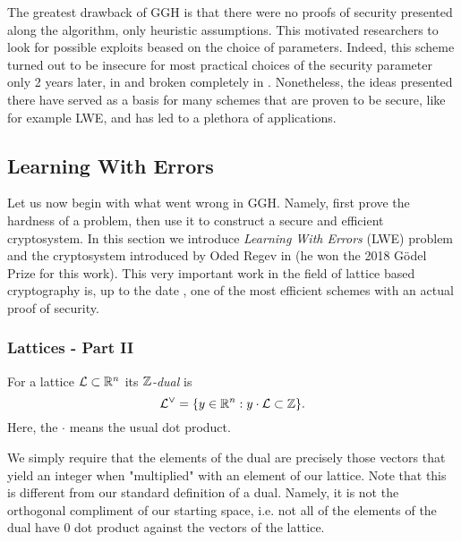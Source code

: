The greatest drawback of GGH is that there were no proofs of security presented along the algorithm, only heuristic assumptions. This motivated researchers to look for possible exploits beased on the choice of parameters. Indeed, this scheme turned out to be insecure for most practical choices of the security parameter only 2 years later, in \cite{break1} and broken completely in \cite{break2}. Nonetheless, the ideas presented there have served as a basis for many schemes that are proven to be secure, like for example LWE, and has led to a plethora of applications.
\subsection{Learning With Errors}
Let us now begin with what went wrong in GGH. Namely, first prove the hardness of a problem, then use it to construct a secure and efficient cryptosystem. In this section we introduce \textit{Learning With Errors} (LWE) problem and the cryptosystem introduced by Oded Regev in \cite{regev} (he won the 2018 Gödel Prize for this work). This very important work in the field of lattice based cryptography is, up to the date , one of the most efficient schemes with an actual proof of security.

\iffalse
\subsubsection*{Lattices - Part II}

\begin{definition}[Dual]
    For a lattice $\mathcal{L} \subset \mathbb{R}^n$ its $\mathbb{Z}$\textit{-dual} is
    $$ \mathcal{L}^{\vee} = \{ y \in \mathbb{R}^n : y \cdot \mathcal{L} \subset \mathbb{Z} \}.$$
    Here, the $\cdot$ means the usual dot product.
\end{definition}

We simply require that the elements of the dual are precisely those vectors that yield an integer when "multiplied" with an element of our lattice. Note that this is different from our standard definition of a dual. Namely, it is not the orthogonal compliment of our starting space, i.e. not all of the elements of the dual have 0 dot product against the vectors of the lattice.


